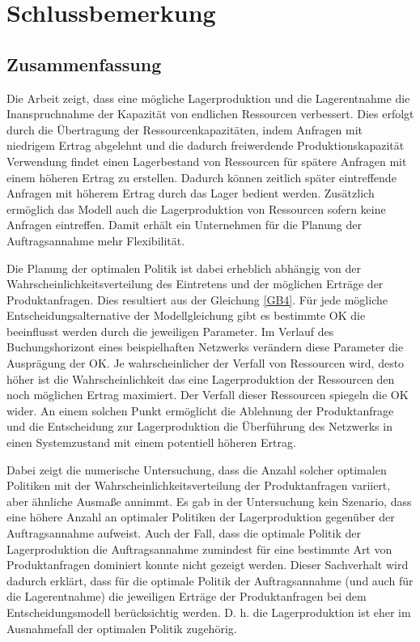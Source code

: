 \chapter{Schlussbemerkung}
\setcounter{footnote}{9}

\section*{Zusammenfassung}

Die Arbeit zeigt, dass eine mögliche Lagerproduktion und die Lagerentnahme die Inanspruchnahme der Kapazität von endlichen Ressourcen verbessert. Dies erfolgt durch die Übertragung der Ressourcenkapazitäten, indem Anfragen mit niedrigem Ertrag abgelehnt und die dadurch freiwerdende Produktionskapazität Verwendung findet einen Lagerbestand von Ressourcen für spätere Anfragen mit einem höheren Ertrag zu erstellen. Dadurch können zeitlich später eintreffende Anfragen mit höherem Ertrag durch das Lager bedient werden. Zusätzlich ermöglich das Modell auch die Lagerproduktion von Ressourcen sofern keine Anfragen eintreffen. Damit erhält ein Unternehmen für die Planung der Auftragsannahme mehr Flexibilität.

Die Planung der optimalen Politik ist dabei erheblich abhängig von der Wahrscheinlichkeitsverteilung des Eintretens und der möglichen Erträge der Produktanfragen. Dies resultiert aus der Gleichung \eqref{GB4}. Für jede mögliche Entscheidungsalternative der Modellgleichung gibt es bestimmte OK die beeinflusst werden durch die jeweiligen Parameter. Im Verlauf des Buchungshorizont eines beispielhaften Netzwerks verändern diese Parameter die Ausprägung der OK. Je wahrscheinlicher der Verfall von Ressourcen wird, desto höher ist die Wahrscheinlichkeit das eine Lagerproduktion der Ressourcen den noch möglichen Ertrag maximiert. Der Verfall dieser Ressourcen spiegeln die OK wider. An einem solchen Punkt ermöglicht die Ablehnung der Produktanfrage und die Entscheidung zur Lagerproduktion die Überführung des Netzwerks in einen Systemzustand mit einem potentiell höheren Ertrag.

Dabei zeigt die numerische Untersuchung, dass die Anzahl solcher optimalen Politiken mit der Wahrscheinlichkeitsverteilung der Produktanfragen variiert, aber ähnliche Ausmaße annimmt. Es gab in der Untersuchung kein Szenario, dass eine höhere Anzahl an optimaler Politiken der Lagerproduktion gegenüber der Auftragsannahme aufweist. Auch der Fall, dass die optimale Politik der Lagerproduktion die Auftragsannahme zumindest für eine bestimmte Art von Produktanfragen dominiert konnte nicht gezeigt werden. Dieser Sachverhalt wird dadurch erklärt, dass für die optimale Politik der Auftragsannahme (und auch für die Lagerentnahme) die jeweiligen Erträge der Produktanfragen bei dem Entscheidungsmodell berücksichtig werden. D. h. die Lagerproduktion ist eher im Ausnahmefall der optimalen Politik zugehörig.

